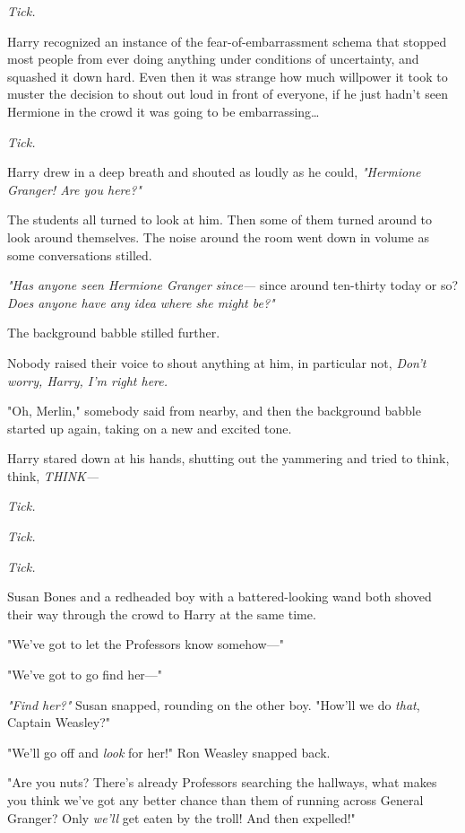 \emph{Tick.}

Harry recognized an instance of the fear-of-embarrassment schema that stopped 
most people from ever doing anything under conditions of uncertainty, and 
squashed it down hard. Even then it was strange how much willpower it took to 
muster the decision to shout out loud in front of everyone, if he just hadn't 
seen Hermione in the crowd it was going to be embarrassing{\ldots}

\emph{Tick.}

Harry drew in a deep breath and shouted as loudly as he could, \emph{"Hermione 
Granger! Are you here?"}

The students all turned to look at him. Then some of them turned around to look 
around themselves. The noise around the room went down in volume as some 
conversations stilled.

\emph{"Has anyone seen Hermione Granger since---} since around ten-thirty today 
or so? \emph{Does anyone have any idea where she might be?"}

The background babble stilled further.

Nobody raised their voice to shout anything at him, in particular not, 
\emph{Don't worry, Harry, I'm right here.}

"Oh, Merlin," somebody said from nearby, and then the background babble started 
up again, taking on a new and excited tone.

Harry stared down at his hands, shutting out the yammering and tried to think, 
think, \emph{THINK---}

\emph{Tick.}

\emph{Tick.}

\emph{Tick.}

Susan Bones and a redheaded boy with a battered-looking wand both shoved their 
way through the crowd to Harry at the same time.

"We've got to let the Professors know somehow---"

"We've got to go find her---"

\emph{"Find her?"} Susan snapped, rounding on the other boy. "How'll we do 
\emph{that}, Captain Weasley?"

"We'll go off and \emph{look} for her!" Ron Weasley snapped back.

"Are you nuts? There's already Professors searching the hallways, what makes 
you think we've got any better chance than them of running across General 
Granger? Only \emph{we'll} get eaten by the troll! And then expelled!"


